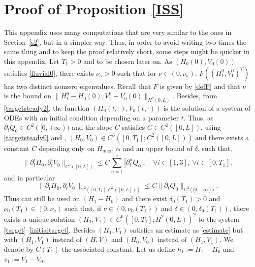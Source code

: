 \documentclass[JEP,XML,SOM,Unicode]{cedram}
\theoremstyle{definition}
\begin{document}
\section{Proof of Proposition \ref{ISS}}
\label{AppendixISS}
This appendix uses many computations that are very similar to the {ones}
in Section~\ref{s2}, but in a simpler way. Thus, in order to avoid writing two times the same thing and to keep the proof relatively short, some steps might be quicker in this appendix.
Let $T_{1}\!>\!0$ and to be chosen later on. As $(H_{0}(0),V_{0}(0))$ satisfies \eqref{fluvial0}, there exists \hbox{$\nu_{a}\!>\!0$} such that for $\nu\in(0,\nu_{a})$, $F((H_{1}^{0},V_{1}^{0})^{T})$
has two distinct nonzero eigenvalues. Recall that $F$ is given by \eqref{defF} and that $\nu$ is the bound on \hbox{$\lVert H_{1}^{0}-H_{0}(0),V_{1}^{0}-V_{0}(0)\rVert_{H^{2}(0,L)}$}.
Besides, from \eqref{targetsteady2}, the function $(H_{0}(t,\cdot),V_{0}(t,\cdot))$ is the solution of a system of {ODEs} with an initial condition depending on a parameter $t$. Thus, as $\partial_{t}Q_{0}\in C^{2}([0,+\infty))$ and the slope $C$ satisfies $C\in C^{2}([0,L])$,
using \eqref{targetsteady0} and \cite[Chap.\,5, Th.\,3.1]{Hartman}, $(H_{0},V_{0})\in C^{3}([0,T_{1}]; C^{2}([0,L]))$ and there exists a constant $C$ depending only on $H_{\max}$, $\alpha$ {and
an upper bound of $\delta$,} such that,
{\begin{equation}
\label{boundH0V0}
\lVert\partial_{t}^{i}H_{0},\partial_{t}^{i}V_{0}\rVert_{C^{2}([0,L])}\leq C\sum\limits_{n=1}^{i}\left|\partial_{t}^{n}Q_{0}\right|,\quad\forall i\in[1,3],\ \forall t\in[0,T_{1}],
\end{equation} and in particular}
\begin{equation}
\lVert\partial_{t} H_{0},\partial_{t} V_{0}\rVert_{C^{2}([0,T_{1}];C^{2}([0,L]))}\leq C \lVert\partial_{t}Q_{0}\rVert_{C^{{2}}([0,+\infty))}.
\label{H0V0bound}
\end{equation}
Thus \cite[Th.\,2.1]{Wang} can still be used
{on $(H_{1}-H_{0})$}
and
there exist $\delta_{0}(T_{1})>0$ and $\nu_{0}(T_{1})\in(0,\nu_{a})$ such that, if $\nu\in(0,\nu_{0}(T_{1}))$ and $\delta\in(0,\delta_{0}(T_{1}))$, there exists a unique solution $(H_{1},V_{1})\in C^{0}([0,T_{1}];H^{2}(0,L))^{{2}}$ to the system \eqref{target}--\eqref{initialtarget}.
Besides $(H_{1},V_{1})$ satisfies an estimate as \eqref{estimate} but with $(H_{1},V_{1})$ instead of $(H,V)$ and $(H_{0},V_{0})$ instead of $(H_{1},V_{1})$. We denote by $C(T_{1})$ the associated constant.
Let us define $h_{1}:=H_{1}-H_{0}$ and $v_{1}:=V_{1}-V_{0}$.
\end{document}

